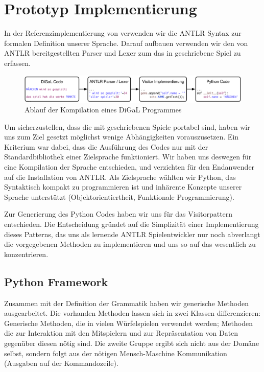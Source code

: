 
\chapter{Prototyp Implementierung}
\label{cha:implementierung}

In der Referenzimplementierung von \dg verwenden wir die ANTLR Syntax zur formalen Definition unserer Sprache. Darauf aufbauen verwenden wir den von ANTLR bereitgestellten Parser und Lexer zum das in \dg geschriebene Spiel zu erfassen. \\

    \begin{figure}[ht]
    	\centering
        \includegraphics[width=\textwidth]{Flow.pdf}
    	\caption{Ablauf der Kompilation eines DiGaL Programmes}
    	\label{flow}
    \end{figure}

Um sicherzustellen, dass die mit \dg geschriebenen Spiele portabel sind, haben wir uns zum Ziel gesetzt möglichst wenige Abhängigkeiten vorauszusetzen. 
Ein Kriterium war dabei, dass die Ausführung des Codes nur mit der Standardbibliothek einer Zielsprache funktioniert. Wir haben uns deswegen für eine Kompilation der Sprache entschieden, und verzichten für den Endanwender auf die Installation von ANTLR. Als Zielsprache wählten wir Python, das Syntaktisch kompakt zu programmieren ist und inhärente Konzepte unserer Sprache unterstützt (Objektorientiertheit, Funktionale Programmierung). 

Zur Generierung des Python Codes haben wir uns für das Visitorpattern entschieden. Die Entscheidung gründet auf die Simplizität einer Implementierung dieses Patterns, das uns als lernende ANTLR Spielentwickler nur noch abverlangt die vorgegebenen Methoden zu implementieren und uns so auf das wesentlich zu konzentrieren. 

\section{Python Framework} %
\label{sec:python_framework}
    
    Zusammen mit der Definition der Grammatik haben wir generische Methoden ausgearbeitet. Die vorhanden Methoden lassen sich in zwei Klassen differenzieren: Generische Methoden, die in vielen Würfelspielen verwendet werden; Methoden die zur Interaktion mit den Mitspielern und zur Repräsentation von Daten gegenüber diesen nötig sind. Die zweite Gruppe ergibt sich nicht aus der Domäne selbst, sondern folgt aus der nötigen Mensch-Maschine Kommunikation (Ausgaben auf der Kommandozeile).
    
